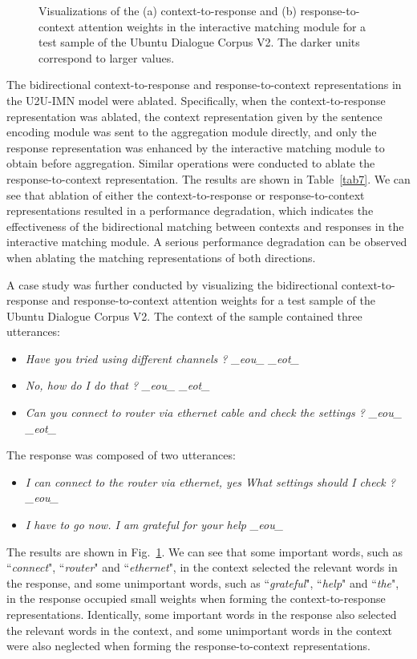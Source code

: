 \documentclass[journal]{IEEEtran}
\begin{document}
     \begin{figure}[t]
    \centering
    \caption{Visualizations of the (a) context-to-response and (b) response-to-context attention weights in the interactive matching module for a test sample of the Ubuntu Dialogue Corpus V2. The darker units correspond to larger values.}
    \label{fig6}
    \end{figure}

    The bidirectional context-to-response and response-to-context representations in the U2U-IMN model were ablated. Specifically, when the context-to-response representation was ablated, the context representation given by the sentence encoding module  was sent to the aggregation module directly, and only the response representation  was enhanced by the interactive matching module to obtain  before aggregation.
    Similar operations were conducted to ablate the response-to-context representation.
    The results are shown in Table~\ref{tab7}. We can see that ablation of either the context-to-response or response-to-context representations resulted in a performance degradation, which indicates the effectiveness of the bidirectional matching between contexts and responses in the interactive matching module. A serious performance degradation can be observed when ablating the matching representations of both directions.

    A case study was further conducted by visualizing the bidirectional context-to-response and response-to-context attention weights for a test sample of the Ubuntu Dialogue Corpus V2.
    The context of the sample contained three utterances:
    \begin{itemize}
    \item \emph{Have you tried using different channels ? \_eou\_ \_eot\_}
    \item \emph{No, how do I do that ? \_eou\_ \_eot\_}
    \item \emph{Can you connect to router via ethernet cable and check the settings ? \_eou\_ \_eot\_}
    \end{itemize}
    The response was composed of two utterances:
    \begin{itemize}
    \item \emph{I can connect to the router via ethernet, yes  What settings should I check ? \_eou\_}
    \item \emph{I have to go now. I am grateful for your help \_eou\_}
    \end{itemize}
    The results are shown in Fig.~\ref{fig6}. We can see that some important words, such as ``\emph{connect}", ``\emph{router}" and ``\emph{ethernet}", in the context selected the relevant words in the response, and some unimportant words, such as ``\emph{grateful}", ``\emph{help}" and ``\emph{the}", in the response occupied small weights when forming the context-to-response representations. Identically, some important words in the response also selected the relevant words in the context, and some unimportant words in the context were also neglected when forming the response-to-context representations.
\end{document}

